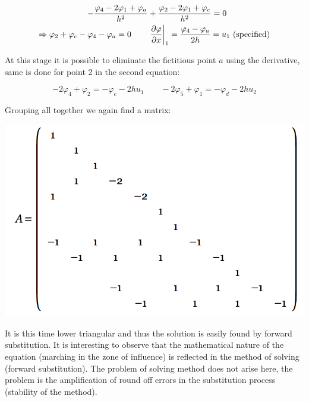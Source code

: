 \begin{equation}
\begin{aligned}
- \frac{\varphi _4 - 2\varphi _1 + \varphi _a}{h^2} &+ \frac{\varphi _2 - 2\varphi _1 + \varphi _c}{h^2} = 0\\
\Rightarrow \varphi _2 + \varphi _c - \varphi _4 - \varphi _a = 0 \qquad &\left.\frac{\partial \varphi}{\partial x} \right| _1 = \frac{\varphi _4 - \varphi _a}{2h} = u_1 \mbox{ (specified)}
\end{aligned}
\end{equation}

At this stage it is possible to eliminate the fictitious point $a$ using the derivative, same is done for point 2 in the second equation: 

\begin{equation}
-2\varphi_4 + \varphi_2 = - \varphi_c -2hu_1 \qquad -2\varphi_5 + \varphi_1 = - \varphi_d -2hu_2
\end{equation}

Grouping all together we again find a matrix: 

\begin{center}
\includegraphics[scale=0.6]{ch2/9}
\end{center}

It is this time lower triangular and thus the solution is easily found by forward substitution. It is interesting to observe that the mathematical nature of the equation (marching in the zone of influence) is reflected in the method of solving (forward substitution). The problem of solving method does not arise here, the problem is the amplification of round off errors in the substitution process (stability of the method).


